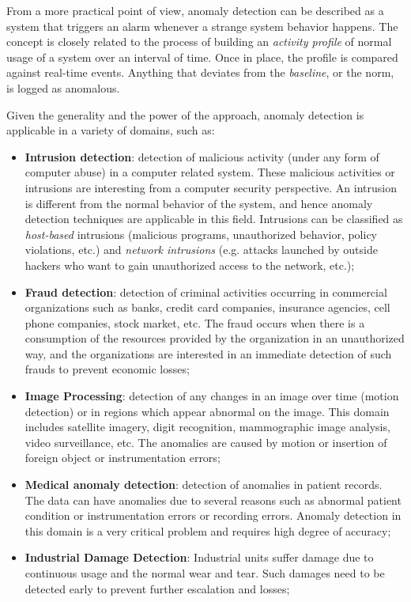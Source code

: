 \documentclass[12pt,a4paper,cucitura]{toptesi}
\begin{document}
From a more practical point of view, anomaly detection can be described as a system that triggers an alarm whenever a strange system behavior happens. The concept is closely related to the process of building an \emph{activity profile} of normal usage of a system over an interval of time.
Once in place, the profile is compared against real-time events.
Anything that deviates from the \emph{baseline}, or the norm, is logged as anomalous.

Given the generality and the power of the approach, anomaly detection is applicable in a variety of domains, such as:

\begin{itemize}

\item \textbf{Intrusion detection}: detection of malicious activity (under any form of computer abuse) in a computer related system. These malicious activities or intrusions are interesting from a computer security
perspective.
An intrusion is different from the normal behavior of the system, and hence anomaly detection techniques are applicable in this field.
Intrusions can be classified as \emph{host-based} intrusions (malicious programs, unauthorized behavior, policy violations, etc.) and \emph{network intrusions} (e.g. attacks launched by outside hackers who want to gain unauthorized access to the network, etc.);

\item \textbf{Fraud detection}: detection of criminal activities occurring in commercial organizations such as banks, credit card companies, insurance agencies, cell phone companies, stock market, etc. 
The fraud occurs when there is a consumption of the resources provided by the organization in an unauthorized way, and the organizations are interested in an immediate detection of such frauds to prevent economic losses;

\item \textbf{Image Processing}: detection of any changes in an image over time (motion detection) or in regions which appear abnormal on the image. This domain includes satellite imagery, digit recognition, mammographic image analysis, video surveillance, etc. 
The anomalies are caused by motion or insertion of foreign object or instrumentation errors;

\item \textbf{Medical anomaly detection}: detection of anomalies in patient records.
The data can have anomalies due to several reasons such as abnormal patient condition or instrumentation errors or recording errors.
Anomaly detection in this domain is a very critical problem and requires high degree of accuracy;

\item \textbf{Industrial Damage Detection}: Industrial units suffer damage due to continuous usage and the normal wear and tear.
Such damages need to be detected early to prevent further escalation and losses;

\end{itemize}
\end{document}
